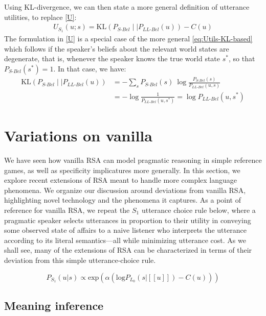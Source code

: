 \documentclass{sp}
\newcommand{\sem}[1]{\ensuremath{[\![#1]\!]}}
\begin{document}
Using KL-divergence, we can then state a more general definition of utterance utilities, to
replace \eqref{U}:
\begin{align}
  \label{eq:Utils-KL-based}
  U_{S_1}(u; s) = \text{KL}(P_{S\text{-}Bel} \mid \mid P_{LL\text{-}Bel}(u)) - C(u)
\end{align}
The formulation in \eqref{U} is a special case of the more general \eqref{eq:Utils-KL-based}
which follows if the speaker's beliefs about the relevant world states are degenerate, that is,
whenever the speaker knows the true world state $s^{*}$, so that $P_{S\text{-}Bel}(s^{*})=1$.
In that case, we have:
\begin{align*}
  \text{KL}(P_{S\text{-}Bel} \mid \mid P_{LL\text{-}Bel}(u)) & = - \sum_{s} P_{S\text{-}Bel}(s) \ \log \frac{P_{S\text{-}Bel}(s)}{P_{LL\text{-}Bel}(u,s)} \\
  & =  - \log\frac{1}{P_{LL\text{-}Bel}(u,s^*)} = \log P_{LL\text{-}Bel}(u,s^*)
\end{align*}


\section{Variations on vanilla} \label{variations}

We have seen how vanilla RSA can model pragmatic reasoning in simple reference games, as well as specificity implicatures more generally. In this section, we explore recent extensions of RSA meant to handle more complex language phenomena. We organize our discussion around deviations from vanilla RSA, highlighting novel technology and the phenomena it captures. As a point of reference for vanilla RSA, we repeat the $S_1$ utterance choice rule below, where a pragmatic speaker selects utterances in proportion to their utility in conveying some observed state of affairs to a naive listener who interprets the utterance according to its literal semantics---all while minimizing utterance cost. As we shall see, many of the extensions of RSA can be characterized in terms of their deviation from this simple utterance-choice rule.

\begin{equation} \label{S1-repeat}
P_{S_1}(u|s) \propto \textrm{exp}(\alpha (\textrm{log}P_{L_0}(s|\sem{u}) - C(u)))
\end{equation}

\subsection{Meaning inference}
\end{document}
